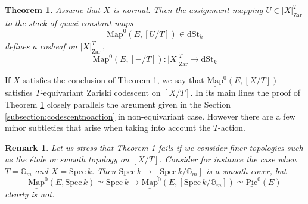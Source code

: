 \documentclass[11pt,letterpaper]{amsart}
\newtheorem{theorem}[dummy]{Theorem}
\newtheorem{remark}[dummy]{Remark}
\newcommand{\bG}{\mathbb{G}}
\newcommand{\Mapo}[2]{\underline{\mathrm{Map}}^{0}\left (#1,#2\right )}
\newcommand{\dStk}{\mathrm{dSt}_{k}}
\newcommand{\Spec}{\mathrm{S}\mathrm{pec}\,}
\newcommand{\Pic}{\underline{\mathrm{Pic}}}
\newcommand{\Zar}[1]{|#1|_{\mathrm{Zar}}}
\begin{document}
\begin{theorem}\label{proposition:codescentnormalvar}
Assume that $X$ is normal. Then the assignment mapping  
$U \in \Zar{X}^T$ to the stack of quasi-constant maps $$\Mapo{E}{[U/T]} \in \dStk$$  
defines a cosheaf on $\Zar{X}^T \, ,$
$$
\Mapo{E}{[-/T]}: \Zar{X}^T \rightarrow\dStk
$$
\end{theorem}
 If $X$ satisfies the conclusion of Theorem \ref{proposition:codescentnormalvar}, we say that $
\Mapo{E}{[X/T]}$ satisfies $T$-equivariant Zariski codescent on $[X/T]$. In its main lines the proof of Theorem \ref{proposition:codescentnormalvar} closely parallels the argument  given in the   Section \ref{subsection:codescentnoaction} in non-equivariant case. However there are a few minor  subtleties that arise when taking into account the $T$-action.  
\begin{remark}
Let us stress that Theorem \ref{proposition:codescentnormalvar} fails if we consider finer topologies such as the \'etale or smooth topology on $[X/T]$. Consider for instance the case when $T=\bG_m$ and $X = \Spec k$. Then $\Spec k \to [\Spec k/\bG_m]$ is a smooth cover, but 
$$
\Mapo{E}{\Spec k} \simeq \Spec k \to \Mapo{E}{[\Spec k/\bG_m]} \simeq \Pic^0(E)
$$
clearly is not.
\end{remark}
\end{document}
